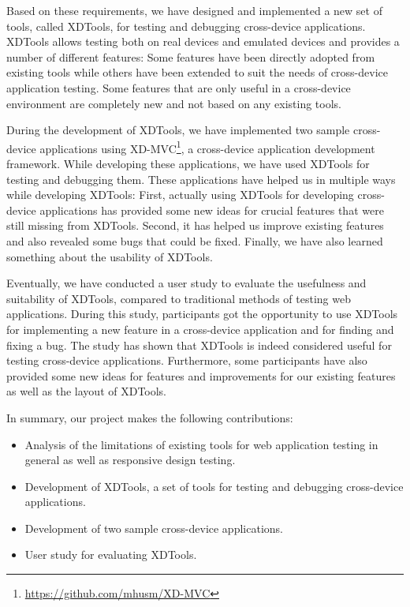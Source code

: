 Based on these requirements, we have designed and implemented a new set of tools, called XDTools, for testing and debugging cross-device applications. XDTools allows testing both on real devices and emulated devices and provides a number of different features: Some features have been directly adopted from existing tools while others have been extended to suit the needs of cross-device application testing. Some features that are only useful in a cross-device environment are completely new and not based on any existing tools.

During the development of XDTools, we have implemented two sample cross-device applications using XD-MVC\footnote{\url{https://github.com/mhusm/XD-MVC}}, a cross-device application development framework. While developing these applications, we have used XDTools for testing and debugging them. These applications have helped us in multiple ways while developing XDTools: First, actually using XDTools for developing cross-device applications has provided some new ideas for crucial features that were still missing from XDTools. Second, it has helped us improve existing features and also revealed some bugs that could be fixed. Finally, we have also learned something about the usability of XDTools.

Eventually, we have conducted a user study to evaluate the usefulness and suitability of XDTools, compared to traditional methods of testing web applications. During this study, participants got the opportunity to use XDTools for implementing a new feature in a cross-device application and for finding and fixing a bug. The study has shown that XDTools is indeed considered useful for testing cross-device applications. Furthermore, some participants have also provided some new ideas for features and improvements for our existing features as well as the layout of XDTools.

In summary, our project makes the following contributions:
\begin{itemize}
	\item Analysis of the limitations of existing tools for web application testing in general as well as responsive design testing.
	\item Development of XDTools, a set of tools for testing and debugging cross-device applications.
	\item Development of two sample cross-device applications.
	\item User study for evaluating XDTools.
\end{itemize}

